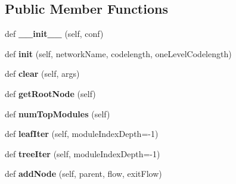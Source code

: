 \subsection*{Public Member Functions}
\begin{DoxyCompactItemize}
\item 
\mbox{\label{classinfomap_1_1HierarchicalNetwork_acd8a264005b7f7d4dd8436434598c555}} 
def {\bfseries \+\_\+\+\_\+init\+\_\+\+\_\+} (self, conf)
\item 
\mbox{\label{classinfomap_1_1HierarchicalNetwork_a1cd264c3b3ad51467c9853905c83df9a}} 
def {\bfseries init} (self, network\+Name, codelength, one\+Level\+Codelength)
\item 
\mbox{\label{classinfomap_1_1HierarchicalNetwork_ae552964c1f95169f9de1438971aa048b}} 
def {\bfseries clear} (self, args)
\item 
\mbox{\label{classinfomap_1_1HierarchicalNetwork_a6f7dc52f6f8ff132df6a00574dff188a}} 
def {\bfseries get\+Root\+Node} (self)
\item 
\mbox{\label{classinfomap_1_1HierarchicalNetwork_a92e2e354da44e0b3b2147010c46c5345}} 
def {\bfseries num\+Top\+Modules} (self)
\item 
\mbox{\label{classinfomap_1_1HierarchicalNetwork_ac483ebcd7ecb043f6f14dac23e0c31fc}} 
def {\bfseries leaf\+Iter} (self, module\+Index\+Depth=-\/1)
\item 
\mbox{\label{classinfomap_1_1HierarchicalNetwork_a091f334cf8a4d994b0c94b2c2c38806d}} 
def {\bfseries tree\+Iter} (self, module\+Index\+Depth=-\/1)
\item 
\mbox{\label{classinfomap_1_1HierarchicalNetwork_a7e40828175329e59538c3a4d391a3e40}} 
def {\bfseries add\+Node} (self, parent, flow, exit\+Flow)
\item 
\mbox{\label{classinfomap_1_1HierarchicalNetwork_af1c0e52b2a1b78697e3ef88184f93232}} 

\end{DoxyCompactItemize}

